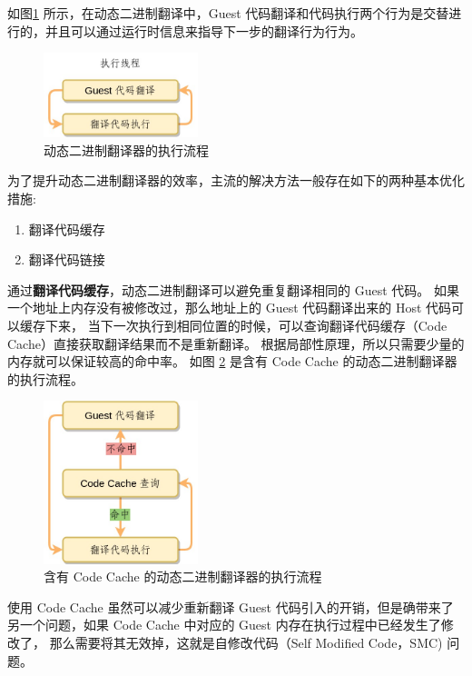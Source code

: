 如图\ref{fig:basic_flow2} 所示，在动态二进制翻译中，Guest 代码翻译和代码执行两个行为是交替进行的，并且可以通过运行时信息来指导下一步的翻译行为行为。
\begin{figure}[!htbp]
	\centering
	\includegraphics[width=0.4\textwidth]{./images/basic-flow2.jpg}
	\caption{动态二进制翻译器的执行流程}
	\label{fig:basic_flow2}
\end{figure}

为了提升动态二进制翻译器的效率，主流的解决方法一般存在如下的两种基本优化措施:
\begin{enumerate}
	\item 翻译代码缓存
	\item 翻译代码链接
\end{enumerate}

通过\textbf{翻译代码缓存}，动态二进制翻译可以避免重复翻译相同的 Guest 代码。
如果一个地址上内存没有被修改过，那么地址上的 Guest 代码翻译出来的 Host 代码可以缓存下来，
当下一次执行到相同位置的时候，可以查询翻译代码缓存（Code Cache）直接获取翻译结果而不是重新翻译。
根据局部性原理，所以只需要少量的内存就可以保证较高的命中率。
如图 \ref{fig:basic_flow3} 是含有 Code Cache 的动态二进制翻译器的执行流程。
\begin{figure}[!htbp]
	\centering
	\includegraphics[width=0.4\textwidth]{./images/basic-flow3.jpg}
	\caption{含有 Code Cache 的动态二进制翻译器的执行流程}
	\label{fig:basic_flow3}
\end{figure}
使用 Code Cache 虽然可以减少重新翻译 Guest 代码引入的开销，但是确带来了另一个问题，如果 Code Cache 中对应的 Guest 内存在执行过程中已经发生了修改了，
那么需要将其无效掉，这就是自修改代码（Self Modified Code，SMC) 问题。

